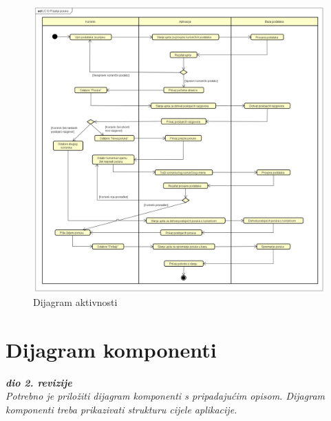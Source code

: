 	\begin{figure}[H]
		\begin{center}
			\includegraphics[width=17cm]{slike/dijagram_aktivnosti.PNG}
		\end{center}
		\caption{Dijagram aktivnosti}
		\label{fig:dijakt}
	\end{figure}
	
	\eject
	
	
	
	\section{Dijagram komponenti}
	
	\textit{\textbf{dio 2. revizije}} \\
	
	\textit{Potrebno je priložiti dijagram komponenti s pripadajućim opisom. Dijagram komponenti treba prikazivati strukturu cijele aplikacije.} \\
	
	\eject	
